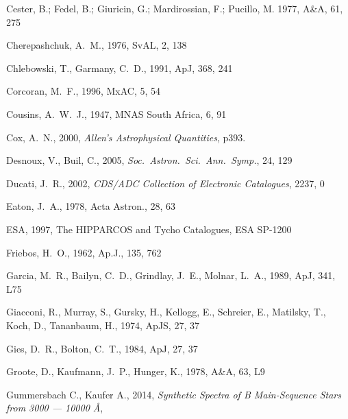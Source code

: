 \documentclass[useAMS,usenatbib]{mnras}                                                                           \usepackage[pdftex]{graphicx}
\begin{document}
\begin{thebibliography}{}
Cester, B.; Fedel, B.; Giuricin, G.; Mardirossian, F.; Pucillo, M.
1977, A{\&}A, 61, 275

Cherepashchuk, A.\ M., 1976, SvAL, 2, 138

Chlebowski, T., Garmany, C.\ D.,
1991, ApJ, 368, 241

Corcoran, M.\ F.,
1996, MxAC, 5, 54

Cousins, A.\ W.\ J., 1947,
MNAS South Africa, 6, 91

 Cox, A.\ N., 2000, {\em Allen's Astrophysical Quantities}, p393.

Desnoux, V.,  Buil, C., 2005,
{\em Soc.\ Astron.\ Sci.\ Ann.\ Symp.},  24, 129

Ducati, J.\ R., 2002,
  {\em CDS/ADC Collection of Electronic Catalogues}, 2237, 0

Eaton, J.\ A., 1978, Acta Astron., 28, 63

ESA, 1997, The HIPPARCOS and Tycho Catalogues, ESA SP-1200
 
Friebos, H.\ O., 1962, Ap.J., 135, 762

Garcia, M.\ R., Bailyn, C.\ D., Grindlay, J.\ E., Molnar, L.\ A., 1989, ApJ, 341, L75

Giacconi, R., Murray, S., Gursky, H., Kellogg, E., Schreier, E., Matilsky, T., Koch, D.,  Tananbaum, H., 1974, ApJS, 27, 37
 
Gies, D.\ R.,  Bolton, C.\ T., 1984, ApJ, 27, 37

Groote, D., Kaufmann, J.\ P., Hunger, K., 1978, A\&A, 63, L9

Gummersbach C., Kaufer A., 2014,
{\em Synthetic Spectra of B Main-Sequence Stars from 3000 --- 10000 \AA},  


\end{thebibliography}
\end{document}
